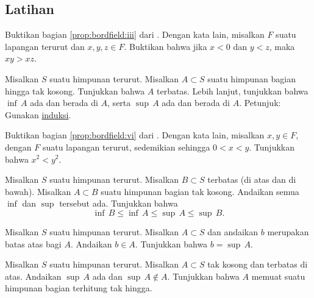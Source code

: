 \subsection{Latihan}

\begin{exercise}
Buktikan bagian \ref{prop:bordfield:iii} dari .
Dengan kata lain, misalkan $F$ suatu lapangan terurut dan $x,y,z \in F$.  Buktikan
bahwa
jika $x < 0$ dan $y < z$, maka $xy > xz$.
\end{exercise}


\begin{exercise} \label{exercise:finitesethasminmax}
Misalkan $S$ suatu himpunan terurut.  Misalkan $A \subset S$ suatu himpunan bagian hingga tak kosong.
Tunjukkan bahwa $A$ terbatas.  Lebih lanjut,
tunjukkan bahwa
$\inf\, A$ ada dan berada di $A$, serta
$\sup\, A$ ada dan berada di $A$.
Petunjuk: Gunakan \hyperref[induction:thm]{induksi}.
\end{exercise}

\begin{exercise} \label{exercise:squareineq}
Buktikan bagian \ref{prop:bordfield:vi} dari .
Dengan kata lain, misalkan $x, y \in F$, dengan $F$ suatu lapangan terurut, sedemikian sehingga
$0 < x < y$.  Tunjukkan bahwa $x^2 < y^2$.
\end{exercise}

\begin{exercise}
Misalkan $S$ suatu himpunan terurut.  Misalkan $B \subset S$ terbatas (di atas dan
di bawah).  Misalkan $A \subset B$ suatu himpunan bagian tak kosong.
Andaikan semua $\inf$ dan
$\sup$ tersebut ada. Tunjukkan bahwa
\begin{equation*}
\inf\, B \leq \inf\, A \leq \sup\, A \leq \sup\, B .
\end{equation*}
\end{exercise}

\begin{exercise}
Misalkan $S$ suatu himpunan terurut.  Misalkan $A \subset S$ dan andaikan
$b$ merupakan batas atas bagi $A$.  Andaikan $b \in A$.  Tunjukkan
bahwa $b = \sup\, A$.
\end{exercise}

\begin{exercise}
Misalkan $S$ suatu himpunan terurut.  Misalkan $A \subset S$ tak kosong dan
terbatas di atas.
Andaikan $\sup\, A$ ada dan
$\sup\, A \notin A$.
Tunjukkan bahwa $A$ memuat suatu himpunan bagian
terhitung tak hingga.
\end{exercise}

